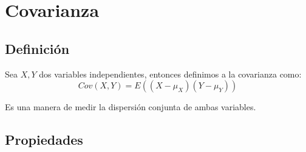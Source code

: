 \documentclass[12pt, fleqn]{report}                             %
\theoremstyle{break}                                            %
\newcommand{\Wrap}[1]           {\left( #1 \right)}             %
\begin{document}
        \clearpage
        \section{Covarianza}

            \subsection{Definición}

                Sea $X, Y$ dos variables independientes, entonces
                definimos a la covarianza como:
                \begin{equation*}
                    Cov(X, Y)
                        = E\Wrap{(X - \mu_{X})(Y - \mu_{Y})}
                \end{equation*}

                Es una manera de medir la dispersión conjunta de ambas variables.



            
            \vspace{1em}
            \subsection{Propiedades}
\end{document}
